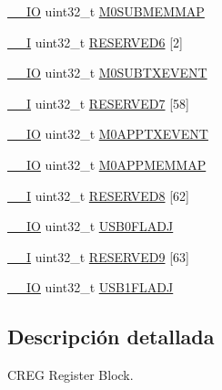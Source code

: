 \begin{DoxyCompactItemize}
\hyperlink{core__sc300_8h_aec43007d9998a0a0e01faede4133d6be}{\+\_\+\+\_\+\+IO} uint32\+\_\+t \hyperlink{struct_l_p_c___c_r_e_g___t_ae818dd381d5c4790d3bb4c9ad08fd1c4}{M0\+S\+U\+B\+M\+E\+M\+M\+AP}
\item 
\hyperlink{core__sc300_8h_af63697ed9952cc71e1225efe205f6cd3}{\+\_\+\+\_\+I} uint32\+\_\+t \hyperlink{struct_l_p_c___c_r_e_g___t_a63b131c3741e5e6a084f6da701f19fc4}{R\+E\+S\+E\+R\+V\+E\+D6} \mbox{[}2\mbox{]}
\item 
\hyperlink{core__sc300_8h_aec43007d9998a0a0e01faede4133d6be}{\+\_\+\+\_\+\+IO} uint32\+\_\+t \hyperlink{struct_l_p_c___c_r_e_g___t_ad2bc316b8bf31d2a422a4900a8cad52e}{M0\+S\+U\+B\+T\+X\+E\+V\+E\+NT}
\item 
\hyperlink{core__sc300_8h_af63697ed9952cc71e1225efe205f6cd3}{\+\_\+\+\_\+I} uint32\+\_\+t \hyperlink{struct_l_p_c___c_r_e_g___t_a78458cd3eeae09ef03bd1f4ddbf51c55}{R\+E\+S\+E\+R\+V\+E\+D7} \mbox{[}58\mbox{]}
\item 
\hyperlink{core__sc300_8h_aec43007d9998a0a0e01faede4133d6be}{\+\_\+\+\_\+\+IO} uint32\+\_\+t \hyperlink{struct_l_p_c___c_r_e_g___t_a1056c3cad4eb4094e18c4bdac511eb81}{M0\+A\+P\+P\+T\+X\+E\+V\+E\+NT}
\item 
\hyperlink{core__sc300_8h_aec43007d9998a0a0e01faede4133d6be}{\+\_\+\+\_\+\+IO} uint32\+\_\+t \hyperlink{struct_l_p_c___c_r_e_g___t_a1f40a3087681f33657e1d39dda8b3151}{M0\+A\+P\+P\+M\+E\+M\+M\+AP}
\item 
\hyperlink{core__sc300_8h_af63697ed9952cc71e1225efe205f6cd3}{\+\_\+\+\_\+I} uint32\+\_\+t \hyperlink{struct_l_p_c___c_r_e_g___t_af823fc7fc0277f531c28aa30666fbcbf}{R\+E\+S\+E\+R\+V\+E\+D8} \mbox{[}62\mbox{]}
\item 
\hyperlink{core__sc300_8h_aec43007d9998a0a0e01faede4133d6be}{\+\_\+\+\_\+\+IO} uint32\+\_\+t \hyperlink{struct_l_p_c___c_r_e_g___t_ada432ad352c696c4206692c9c83fb2bc}{U\+S\+B0\+F\+L\+A\+DJ}
\item 
\hyperlink{core__sc300_8h_af63697ed9952cc71e1225efe205f6cd3}{\+\_\+\+\_\+I} uint32\+\_\+t \hyperlink{struct_l_p_c___c_r_e_g___t_a2e20c23829d0f6e51b5011d0dcb379ee}{R\+E\+S\+E\+R\+V\+E\+D9} \mbox{[}63\mbox{]}
\item 
\hyperlink{core__sc300_8h_aec43007d9998a0a0e01faede4133d6be}{\+\_\+\+\_\+\+IO} uint32\+\_\+t \hyperlink{struct_l_p_c___c_r_e_g___t_aae191a2f00bcf20484f70a9409c2eee1}{U\+S\+B1\+F\+L\+A\+DJ}
\end{DoxyCompactItemize}


\subsection{Descripción detallada}
C\+R\+EG Register Block. 

